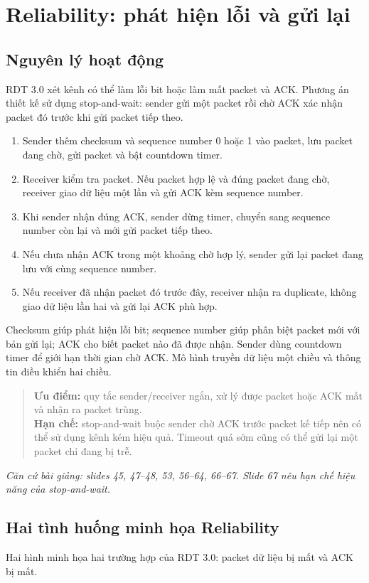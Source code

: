 \documentclass[11pt,a4paper]{article}
\newcommand{\sourcenote}[1]{\par{\small\color{muted}\textit{Căn cứ bài giảng: #1}}\par}
\begin{document}
\clearpage
\section{Reliability: phát hiện lỗi và gửi lại}
\subsection{Nguyên lý hoạt động}
RDT 3.0 xét kênh có thể làm lỗi bit hoặc làm mất packet và ACK. Phương án thiết kế sử dụng stop-and-wait: sender gửi một packet rồi chờ ACK xác nhận packet đó trước khi gửi packet tiếp theo.

\begin{enumerate}
  \item Sender thêm checksum và sequence number 0 hoặc 1 vào packet, lưu packet đang chờ, gửi packet và bật countdown timer.
  \item Receiver kiểm tra packet. Nếu packet hợp lệ và đúng packet đang chờ, receiver giao dữ liệu một lần và gửi ACK kèm sequence number.
  \item Khi sender nhận đúng ACK, sender dừng timer, chuyển sang sequence number còn lại và mới gửi packet tiếp theo.
  \item Nếu chưa nhận ACK trong một khoảng chờ hợp lý, sender gửi lại packet đang lưu với cùng sequence number.
  \item Nếu receiver đã nhận packet đó trước đây, receiver nhận ra duplicate, không giao dữ liệu lần hai và gửi lại ACK phù hợp.
\end{enumerate}
Checksum giúp phát hiện lỗi bit; sequence number giúp phân biệt packet mới với bản gửi lại; ACK cho biết packet nào đã được nhận. Sender dùng countdown timer để giới hạn thời gian chờ ACK. Mô hình truyền dữ liệu một chiều và thông tin điều khiển hai chiều.

\begin{quote}
\small
\textbf{Ưu điểm:} quy tắc sender/receiver ngắn, xử lý được packet hoặc ACK mất và nhận ra packet trùng.\\
\textbf{Hạn chế:} stop-and-wait buộc sender chờ ACK trước packet kế tiếp nên có thể sử dụng kênh kém hiệu quả. Timeout quá sớm cũng có thể gửi lại một packet chỉ đang bị trễ.
\end{quote}
\sourcenote{slides 45, 47--48, 53, 56--64, 66--67. Slide 67 nêu hạn chế hiệu năng của stop-and-wait.}

\clearpage
\subsection{Hai tình huống minh họa Reliability}
Hai hình minh họa hai trường hợp của RDT 3.0: packet dữ liệu bị mất và ACK bị mất.
\end{document}
